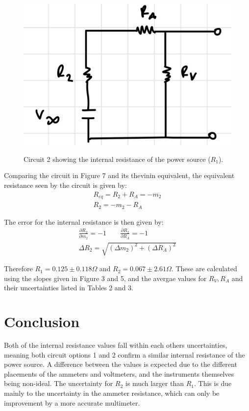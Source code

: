 \documentclass[12pt]{article}
\begin{document}
\begin{figure}[H]
    \begin{centering}
    \includegraphics[width=0.5 \textwidth]{img/thev_2.jpeg}
    \label{fig:thev2}
    \caption{Circuit 2 showing the internal resistance of the power source ($R_1$).}
    \end{centering}
\end{figure}
Comparing the circuit in Figure 7 and its thevinin equivalent, the equivalent resistance seen by the circuit is given by:
\begin{align}
    R_{eq} = R_2 + R_A = -m_2 \\
    R_2 = -m_2 - R_A
\end{align}

The error for the internal resistance is then given by:
\begin{align}
    \frac{\partial R_2}{\partial m_2} = -1 \qquad
    \frac{\partial R_2}{\partial R_A} = -1 \qquad \\
    \Delta R_2 = \sqrt{\left(\Delta m_2\right)^2 + \left(\Delta R_A\right)^2}
\end{align}

Therefore $R_1 = 0.125 \pm 0.118 \Omega$ and $R_2 = 0.067 \pm 2.61 \Omega$. These are calculated using the slopes given in Figure 3 and 5, and the avergae values for $R_V, R_A$ and their uncertainties listed in Tables 2 and 3.

\section{Conclusion}
Both of the internal resistance values fall within each others uncertainties, meaning both circuit options 1 and 2 confirm a similar internal resistance of the power source.
A difference between the values is expected due to the different placements of the ammeters and voltmeters, and the instruments themselves being non-ideal. 
The uncertainty for $R_2$ is much larger than $R_1$. This is due mainly to the uncertainty in the ammeter resistance, which can only be improvement by a more accurate multimeter.
\end{document}
